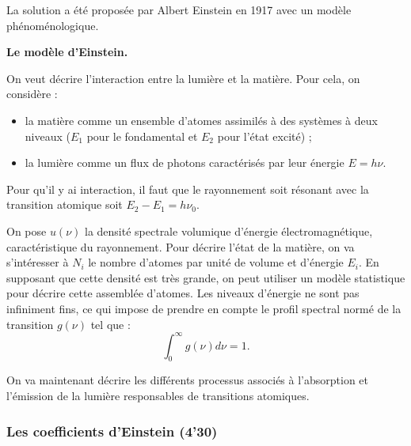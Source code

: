 La solution a été proposée par Albert Einstein en 1917 avec un modèle phénoménologique.

\begin{slide}
\textbf{Le modèle d'Einstein.}
\end{slide}

On veut décrire l'interaction entre la lumière et la matière.
Pour cela, on considère :
\begin{itemize}
\item la matière comme un ensemble d'atomes assimilés à des systèmes à deux niveaux ($E_1$ pour le fondamental et $E_2$ pour l'état excité) ;
\item la lumière comme un flux de photons caractérisés par leur énergie $E = h\nu$.
\end{itemize}
Pour qu'il y ai interaction, il faut que le rayonnement soit résonant avec la transition atomique soit $E_2 - E_1 = h\nu_0$.

On pose $u(\nu)$ la densité spectrale volumique d'énergie électromagnétique, caractéristique du rayonnement.
Pour décrire l'état de la matière, on va s'intéresser à $N_i$ le nombre d'atomes par unité de volume et d'énergie $E_i$.
En supposant que cette densité est très grande, on peut utiliser un modèle statistique pour décrire cette assemblée d'atomes.
Les niveaux d'énergie ne sont pas infiniment fins, ce qui impose de prendre en compte le profil spectral normé de la transition $g(\nu)$ tel que :
\begin{equation}
\int_0^\infty g(\nu)d\nu = 1.
\end{equation}

\begin{transition}
On va maintenant décrire les différents processus associés à l'absorption et l'émission de la lumière responsables de transitions atomiques.
\end{transition}

\subsubsection{Les coefficients d'Einstein (4'30)}

